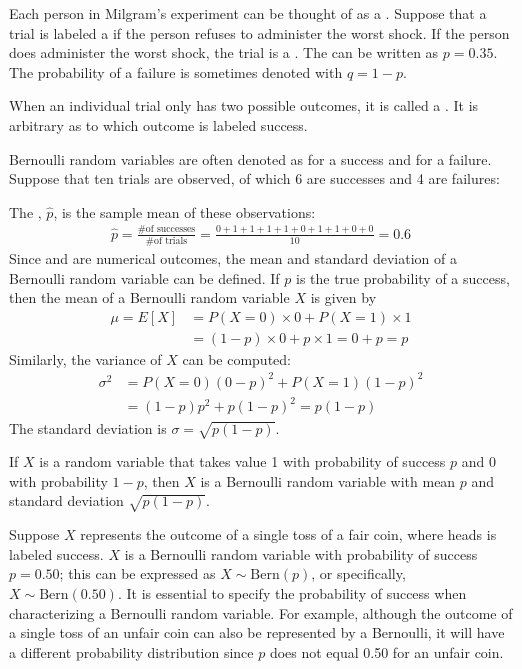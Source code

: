 Each person in Milgram's experiment can be thought of as a . Suppose that a trial is labeled a  if the person refuses to administer the worst shock. If the person does administer the worst shock, the trial is a . The  can be written as $p=0.35$. The probability of a failure is sometimes denoted with $q=1-p$.

When an individual trial only has two possible outcomes, it is called a . It is arbitrary as to which outcome is labeled success. 

Bernoulli random variables are often denoted as  for a success and  for a failure. Suppose that ten trials are observed, of which 6 are successes and 4 are failures:
\begin{center}
	         
\end{center}
The , $\hat{p}$, is the sample mean of these observations:
\begin{eqnarray*}
	\hat{p} = \frac{\text{\# of successes}}{\text{\# of trials}} = \frac{0+1+1+1+1+0+1+1+0+0}{10} = 0.6
\end{eqnarray*}%
Since  and  are numerical outcomes, the {mean} and {standard deviation} of a Bernoulli random variable can be defined. If ${p}$ is the true probability of a success, then the mean of a Bernoulli random variable $X$ is given by
\begin{align*}
\mu = E[X] &= P(X=0)\times0 + P(X=1)\times1 \\
&= (1-p)\times0 + p\times 1 = 0+p = p
\end{align*}
Similarly, the variance of $X$ can be computed:
\begin{align*}
\sigma^2 &= {P(X=0)(0-p)^2 + P(X=1)(1-p)^2} \\
&= {(1-p)p^2 + p(1-p)^2} = {p(1-p)}
\end{align*}
The standard deviation is $\sigma=\sqrt{p(1-p)}$.

\begin{termBox}{
		If $X$ is a random variable that takes value 1 with probability of success $p$ and 0 with probability $1-p$, then $X$ is a Bernoulli random variable with mean $p$ and standard deviation $\sqrt{p(1-p)}$.
	}
\end{termBox}

Suppose $X$ represents the outcome of a single toss of a fair coin, where heads is labeled success. $X$ is a Bernoulli random variable with probability of success $p = 0.50$; this can be expressed as $X \sim \textrm{Bern}(p)$, or specifically, $X \sim \textrm{Bern}(0.50)$. It is essential to specify the probability of success when characterizing a Bernoulli random variable. For example, although the outcome of a single toss of an unfair coin can also be represented by a Bernoulli, it will have a different probability distribution since $p$ does not equal 0.50 for an unfair coin. 

